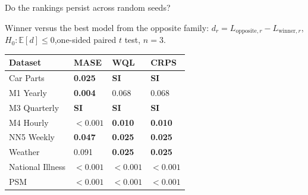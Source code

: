 \documentclass[aspectratio=169,10pt]{beamer}
\begin{document}
\begin{frame}{Do the rankings persist across random seeds?}
  \vspace{-0.02cm}
  \begin{center}
    \colorbox{Paper}{\parbox{0.91\linewidth}{\centering\fontsize{6.7}{7.4}\selectfont
      Winner versus the best model from the opposite family:\quad
      $d_r=L_{\mathrm{opposite},r}-L_{\mathrm{winner},r}$,\quad
      $H_0:\mathbb{E}[d]\leq0$,\quad one-sided paired $t$ test, $n=3$.}}
  \end{center}

  \vspace{0.04cm}
  \begin{center}
    \fontsize{7.2}{8.0}\selectfont
    \renewcommand{\arraystretch}{1.02}
    \setlength{\tabcolsep}{6.5pt}
    \begin{tabular}{L{3.65cm} C{2.40cm} C{2.40cm} C{2.40cm}}
      \toprule
      \textbf{Dataset} & \textbf{MASE} & \textbf{WQL} & \textbf{CRPS} \\
      \midrule
      Car Parts & \textbf{0.025} & \textbf{SI} & \textbf{SI} \\
       M1 Yearly & \textbf{0.004} & 0.068 & 0.068 \\
      M3 Quarterly & \textbf{SI} & \textbf{SI} & \textbf{SI} \\
       M4 Hourly & \textbf{$<0.001$} & \textbf{0.010} & \textbf{0.010} \\
      NN5 Weekly & \textbf{0.047} & \textbf{0.025} & \textbf{0.025} \\
       Weather & 0.091 & \textbf{0.025} & \textbf{0.025} \\
      National Illness & \textbf{$<0.001$} & \textbf{$<0.001$} & \textbf{$<0.001$} \\
       PSM & \textbf{$<0.001$} & \textbf{$<0.001$} & \textbf{$<0.001$} \\

\end{tabular}
\end{center}
\end{frame}
\end{document}
